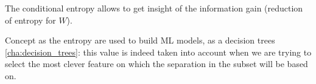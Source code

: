         The conditional entropy allows to get insight of the information gain (reduction of entropy for $W$).
        
        
        Concept as the entropy are used to build ML models, as a decision trees \ref{cha:decision_trees}: this value is indeed taken into account when we are trying to select the most clever feature on which the separation in the subset will be based on. 